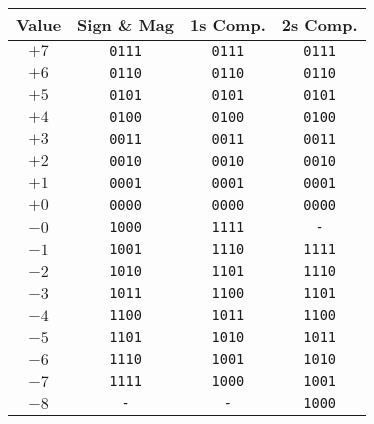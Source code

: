 \begin{tabular*}{\linewidth}{@{\extracolsep{\fill}}cccc}
    \toprule
    Value        & Sign \& Mag & 1s Comp.    & 2s Comp.      \\
    \midrule
    $+7$         & \texttt{0111}    & \texttt{0111} & \texttt{0111} \\
    $+6$         & \texttt{0110}    & \texttt{0110} & \texttt{0110} \\
    $+5$         & \texttt{0101}    & \texttt{0101} & \texttt{0101} \\
    $+4$         & \texttt{0100}    & \texttt{0100} & \texttt{0100} \\
    $+3$         & \texttt{0011}    & \texttt{0011} & \texttt{0011} \\
    $+2$         & \texttt{0010}    & \texttt{0010} & \texttt{0010} \\
    $+1$         & \texttt{0001}    & \texttt{0001} & \texttt{0001} \\
    $+0$         & \texttt{0000}    & \texttt{0000} & \texttt{0000} \\
    \midrule
    $-0$         & \texttt{1000}    & \texttt{1111} & \texttt{-}    \\
    $-1$         & \texttt{1001}    & \texttt{1110} & \texttt{1111} \\
    $-2$         & \texttt{1010}    & \texttt{1101} & \texttt{1110} \\
    $-3$         & \texttt{1011}    & \texttt{1100} & \texttt{1101} \\
    $-4$         & \texttt{1100}    & \texttt{1011} & \texttt{1100} \\
    $-5$         & \texttt{1101}    & \texttt{1010} & \texttt{1011} \\
    $-6$         & \texttt{1110}    & \texttt{1001} & \texttt{1010} \\
    $-7$         & \texttt{1111}    & \texttt{1000} & \texttt{1001} \\
    $-8$         & \texttt{-}       & \texttt{-}    & \texttt{1000} \\
    \bottomrule
\end{tabular*}
